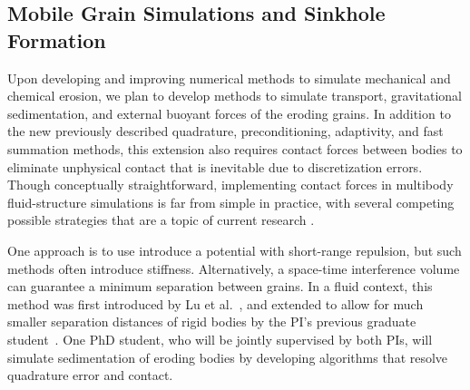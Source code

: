\documentclass[11pt]{article}
\begin{document}

\subsection{Mobile Grain Simulations and Sinkhole Formation}
\label{sec:sinkhole}

Upon developing and improving numerical methods to simulate mechanical and chemical erosion, we plan to develop methods to simulate transport, gravitational sedimentation, and external buoyant forces of the eroding grains. In addition to the new previously described quadrature, preconditioning, adaptivity, and fast summation methods,  this extension also requires contact forces between bodies to eliminate unphysical contact that is inevitable due to discretization errors. Though conceptually straightforward, implementing contact forces in multibody fluid-structure simulations is far from simple in practice, with several competing possible strategies that are a topic of current research \cite{yan2019computing, lu-rah-zor2017, bys-sha-qua2019}.  

One approach is to use introduce a potential with short-range repulsion, but such methods often introduce stiffness. Alternatively, a space-time interference volume can guarantee a minimum separation between grains.  In a fluid context, this method was first introduced by Lu et al.~\cite{lu-rah-zor2017}, and extended to allow for much smaller separation distances of rigid bodies by the PI's previous graduate student~\cite{bys-sha-qua2019}. One PhD student, who will be jointly supervised by both PIs, will simulate sedimentation of eroding bodies by developing algorithms that resolve quadrature error and contact.  
\end{document}
